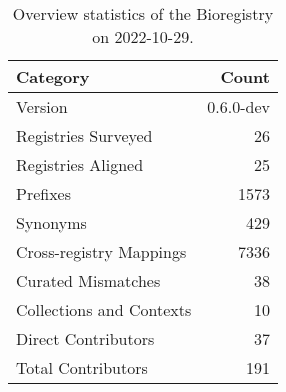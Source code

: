 \begin{table}
\centering
\caption{Overview statistics of the Bioregistry on 2022-10-29.}
\label{tab:bioregistry-summary}
\begin{tabular}{lr}
\toprule
                Category &     Count \\
\midrule
                 Version & 0.6.0-dev \\
     Registries Surveyed &        26 \\
      Registries Aligned &        25 \\
                Prefixes &      1573 \\
                Synonyms &       429 \\
 Cross-registry Mappings &      7336 \\
      Curated Mismatches &        38 \\
Collections and Contexts &        10 \\
     Direct Contributors &        37 \\
      Total Contributors &       191 \\
\bottomrule
\end{tabular}
\end{table}
